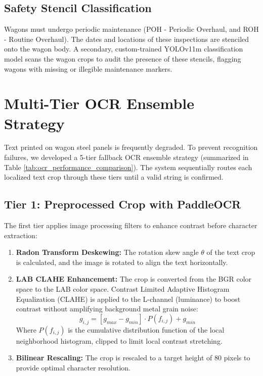 \documentclass[conference]{IEEEtran}
\begin{document}
\subsection{Safety Stencil Classification}
Wagons must undergo periodic maintenance (POH - Periodic Overhaul, and ROH - Routine Overhaul). The dates and locations of these inspections are stenciled onto the wagon body. A secondary, custom-trained YOLOv11m classification model scans the wagon crops to audit the presence of these stencils, flagging wagons with missing or illegible maintenance markers.

\section{Multi-Tier OCR Ensemble Strategy}
\label{sec:ocr_ensemble}
Text printed on wagon steel panels is frequently degraded. To prevent recognition failures, we developed a 5-tier fallback OCR ensemble strategy (summarized in Table \ref{tab:ocr_performance_comparison}). The system sequentially routes each localized text crop through these tiers until a valid string is confirmed.

\subsection{Tier 1: Preprocessed Crop with PaddleOCR}
The first tier applies image processing filters to enhance contrast before character extraction:
\begin{enumerate}
    \item \textbf{Radon Transform Deskewing:} The rotation skew angle $\theta$ of the text crop is calculated, and the image is rotated to align the text horizontally.
    \item \textbf{LAB CLAHE Enhancement:} The crop is converted from the BGR color space to the LAB color space. Contrast Limited Adaptive Histogram Equalization (CLAHE) is applied to the L-channel (luminance) to boost contrast without amplifying background metal grain noise:
    \begin{equation}
    g_{i,j} = \left[ g_{max} - g_{min} \right] \cdot P(f_{i,j}) + g_{min}
    \end{equation}
    Where $P(f_{i,j})$ is the cumulative distribution function of the local neighborhood histogram, clipped to limit local contrast stretching.
    \item \textbf{Bilinear Rescaling:} The crop is rescaled to a target height of 80 pixels to provide optimal character resolution.
\end{enumerate}
\end{document}
